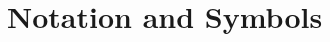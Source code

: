 \documentclass[12pt,a4paper,oneside,pdftex]{report}
\begin{document}


\label{pages-prelude}
\cleardoublepage

\startfirstchapter

\pagestyle{headings}


% 


\chapter*{Notation and Symbols}


\end{document}
